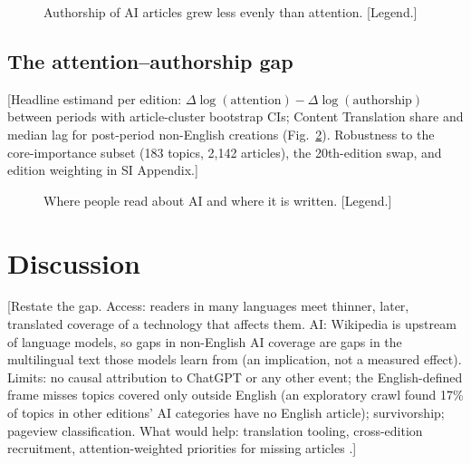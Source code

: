 \documentclass[9pt,twocolumn,twoside]{pnas-new}
\begin{document}
\begin{figure}[t]
\centering
{}
\caption{Authorship of AI articles grew less evenly than attention. [Legend.]}
\label{fig:authorship}
\end{figure}

\subsection*{The attention--authorship gap}
[Headline estimand per edition: $\Delta\log(\text{attention}) - \Delta\log(\text{authorship})$ between periods with article-cluster bootstrap CIs; Content Translation share and median lag for post-period non-English creations (Fig.~\ref{fig:gap}). Robustness to the core-importance subset (183 topics, 2,142 articles), the 20th-edition swap, and edition weighting in SI Appendix.]

\begin{figure}[t]
\centering
{}
\caption{Where people read about AI and where it is written. [Legend.]}
\label{fig:gap}
\end{figure}

\section*{Discussion}
[Restate the gap. Access: readers in many languages meet thinner, later, translated coverage of a technology that affects them. AI: Wikipedia is upstream of language models, so gaps in non-English AI coverage are gaps in the multilingual text those models learn from (an implication, not a measured effect). Limits: no causal attribution to ChatGPT or any other event; the English-defined frame misses topics covered only outside English (an exploratory crawl found 17\% of topics in other editions' AI categories have no English article); survivorship; pageview classification. What would help: translation tooling, cross-edition recruitment, attention-weighted priorities for missing articles \cite{wulczyn2016growing}.]
\end{document}
